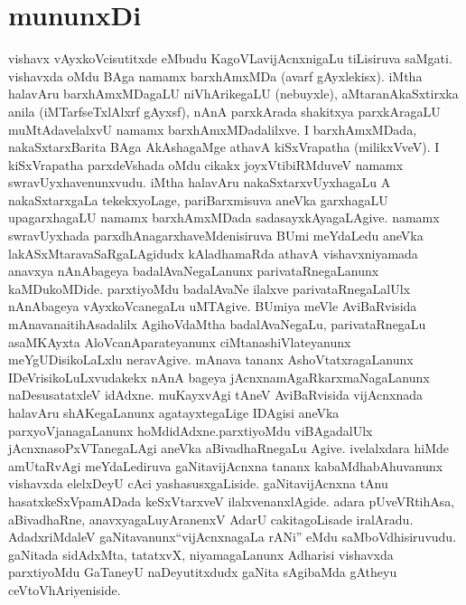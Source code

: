 \chapter*{mununxDi}


\qquad vishavx vAyxkoVcisutitxde eMbudu KagoVLavijAcnxnigaLu tiLisiruva saMgati. vishavxda oMdu BAga namamx barxhAmxMDa (avarf gAyxlekisx). iMtha halavAru barxhAmxMDagaLU niVhArikegaLU (nebuyxle), aMtaranAkaSxtirxka anila (iMTarfseTxlAlxrf gAyxsf), nAnA parxkArada shakitxya parxkAragaLU muMtAdavelalxvU namamx barxhAmxMDadalilxve. I barxhAmxMDa\-da, nakaSxtarxBarita BAga AkAshagaMge athavA kiSxVrapatha (milikxVveV). I kiSxVrapatha parxdeVsha\-da oMdu cikakx joyxVtibiRMduveV namamx swravUyxhavenunxvudu. iMtha halavAru nakaSxtarxvUyxhagaLu A nakaSxtarxgaLa tekekxyoLage, pariBarxmisuva aneVka garxhagaLU upa\break garxhagaLU namamx barxhAmxMDada sadasayxkAyagaLAgive. namamx swravUyxhada parxdhAna\break garxhaveMdenisiruva BUmi meYdaLedu aneVka lakASxMtaravaSaRgaLAgidudx kAladhamaR\-da athavA vishavxniyamada anavxya nAnAbageya badalAvaNegaLanunx parivataRnegaLanunx kaMDukoMDide. parxtiyoMdu badalAvaNe ilalxve parivataRnegaLalUlx nAnA\break bageya vAyxkoVcanegaLu uMTAgive. BUmiya meVle AviBaRvisida mAnavana\break itihAsadalilx AgihoVdaMtha badalAvaNegaLu, parivataRnegaLu asaMKAyxta AloVcanAparateyanunx ciMtanashiVlateyanunx meYgUDisikoLaLxlu neravAgive.  mAnava\- tananx AshoVtatxragaLanunx IDeVrisikoLuLxvudakekx nAnA bageya jAcnxnamAgaRkarxmaNagaLanunx naDesusatatxleV idAdxne. muKayxvAgi tAneV AviBaRvisida vijAcnxnada halavAru shAKegaLanunx agatayxtegaLige IDAgisi aneVka parxyoVjanagaLanunx hoMdidAdxne.\break parxtiyoMdu viBAgadalUlx jAcnxnasoPxVTanegaLAgi aneVka aBivadhaRnegaLu Agive. ivelalxdara hiMde amUtaRvAgi meYdaLediruva gaNitavijAcnxna tananx kabaMdhabAhuvanunx vishavxda elelxDeyU cAci yashasusxgaLiside. gaNitavijAcnxna tAnu hasatxkeSxVpamADada keSxVtarxveV ilalxvenanxlAgide. adara pUveVRtihAsa, aBivadhaRne, anavxyagaLu\break yAranenxV AdarU cakitagoLisade iralAradu. AdadxriMdaleV gaNitavanunx\break ``vijAcnxnagaLa rANi'' eMdu saMboVdhisiruvudu. gaNitada sidAdxMta, tatatxvX, niyama\-gaLanunx Adharisi vishavxda parxtiyoMdu GaTaneyU naDeyutitxdudx gaNita sAgibaMda gAtheyu ceVtoVhAriyeniside.

\bigskip

